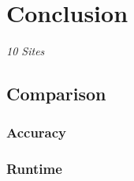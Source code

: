 \chapter{Conclusion}
\label{cha:conclusion}
\emph{10 Sites}

\section{Comparison}
\subsection{Accuracy}
\subsection{Runtime}
